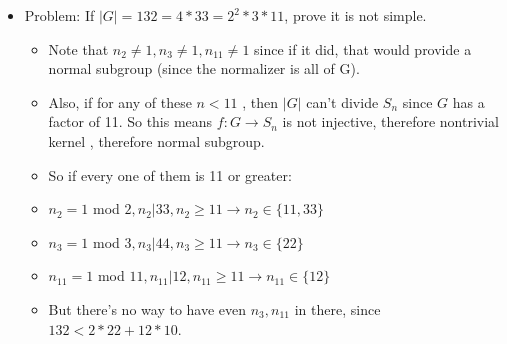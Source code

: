 \documentclass[11pt, oneside]{article}   	%
\begin{document}
\begin{itemize}
\item Problem: If $|G| = 132 = 4 * 33 = 2^2 * 3 * 11$, prove it is not simple.
\begin{itemize}
\item Note that $n_2 \neq 1, n_3 \neq 1, n_{11} \neq 1$ since if it did, that would provide a normal subgroup (since the normalizer is all of G).
\item Also, if for any of these $n < 11$ , then $|G|$ can't divide $S_n$ since $G$ has a factor of 11.  So this means $f: G \rightarrow S_n$ is not injective, therefore nontrivial kernel , therefore normal subgroup.
\item So if every one of them is 11 or greater:
\item $n_2 = 1 $ mod $ 2 , n_2 | 33, n_2 \geq 11\rightarrow n_2 \in \{11, 33\}$
\item $n_3 = 1 $ mod $  3, n_3 | 44, n_3 \geq 11\rightarrow n_3 \in \{22\}$
\item $n_{11} = 1 $ mod $  11, n_{11} | 12, n_{11} \geq 11 \rightarrow n_{11} \in \{12\}$
\item But there's no way to have even $n_3, n_11$ in there, since $132 < 2 * 22 + 12 * 10$.
\end{itemize}


\end{itemize}
\end{document}
